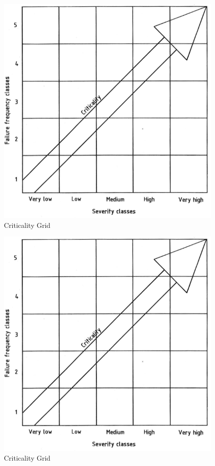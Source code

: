 \documentclass[./dissertation.tex]{subfiles}
\begin{document}
\begin{figure}
        \includegraphics[width=\linewidth]{subfiles/imgs/fmea_criticality_grid.png}
  \caption{Criticality Grid}
        \label{fig:criticality_grid}
\end{figure}



\begin{figure}
	\includegraphics[width=\linewidth]{subfiles/imgs/fmea_criticality_grid.png}
  \caption{Criticality Grid}
	\label{fig:criticality_grid}
\end{figure}
\end{document}
